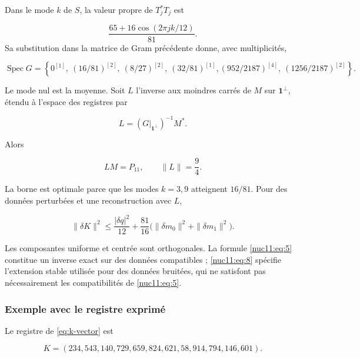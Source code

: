 Dans le mode \(k\) de \(S\), la valeur propre de \(T_j^*T_j\) est

\[
 \frac{65+16\cos(2\pi jk/12)}{81}.
\]
Sa substitution dans la matrice de Gram précédente donne, avec multiplicités,



\begin{equation}
\operatorname{Spec}G=\left\{
0^{[1]},\ (16/81)^{[2]},\ (8/27)^{[2]},\ (32/81)^{[1]},
(952/2187)^{[4]},\ (1256/2187)^{[2]}\right\}.
\label{nuc11:eq:7}
\end{equation}



Le mode nul est la moyenne. Soit \(L\) l’inverse aux moindres carrés
de \(M\) sur \(\mathbf1^\perp\), étendu à l’espace des
registres par




\[
L=(G|_{\mathbf1^\perp})^{-1}M^*.
\]



Alors



\begin{equation}
LM=P_{11},\qquad \|L\|=\frac94.
\label{nuc11:eq:8}
\end{equation}



La borne est optimale parce que les modes \(k=3,9\) atteignent \(16/81\).
Pour des données perturbées et une reconstruction avec \(L\),



\begin{equation}
\|\delta K\|^2\le \frac{|\delta q|^2}{12}
+\frac{81}{16}\bigl(\|\delta m_0\|^2+\|\delta m_1\|^2\bigr).
\label{nuc11:eq:9}
\end{equation}



Les composantes uniforme et centrée sont orthogonales. La formule \eqref{nuc11:eq:5} constitue un inverse exact sur des données compatibles ; \eqref{nuc11:eq:8} spécifie l’extension stable utilisée pour des données bruitées, qui ne satisfont pas nécessairement les compatibilités de \eqref{nuc11:eq:5}.

\subsubsection{Exemple avec le registre exprimé}

Le registre de \eqref{eq:k-vector} est



\begin{equation}
K=(234,543,140,729,659,824,621,58,914,794,146,601).
\label{nuc11:eq:10}
\end{equation}



